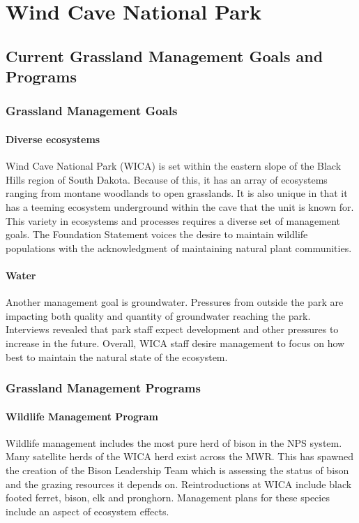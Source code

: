 \section{Wind Cave National Park}

\subsection{Current Grassland Management Goals and Programs}

\subsubsection{Grassland Management Goals}

\paragraph{Diverse ecosystems}
Wind Cave National Park (WICA) is set within the eastern slope of the Black Hills region of South Dakota.
Because of this, it has an array of ecosystems ranging from montane woodlands to open grasslands. 
It is also unique in that it has a teeming ecosystem underground within the cave that the unit is known for. 
This variety in ecosystems and processes requires a diverse set of management goals. 
The Foundation Statement voices the desire to maintain wildlife populations with the acknowledgment of maintaining natural plant communities.

\paragraph{Water}
Another management goal is groundwater. 
Pressures from outside the park are impacting both quality and quantity of groundwater reaching the park. 
Interviews revealed that park staff expect development and other pressures to increase in the future. 
Overall, WICA staff desire management to focus on how best to maintain the natural state of the ecosystem.

\subsubsection{Grassland Management Programs}

\paragraph{Wildlife Management Program}
Wildlife management includes the most pure herd of bison in the NPS system. 
Many satellite herds of the WICA herd exist across the MWR.
This has spawned the creation of the Bison Leadership Team which is assessing the status of bison and the grazing resources it depends on. 
Reintroductions at WICA include black footed ferret, bison, elk and pronghorn. 
Management plans for these species include an aspect of ecosystem effects.

